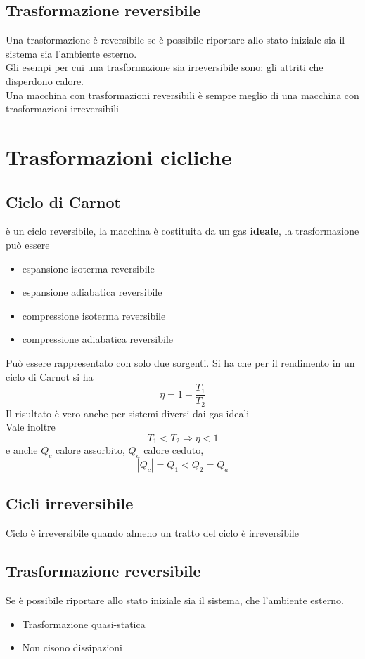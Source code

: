 \documentclass[a4paper]{report}
\begin{document}
  \subsection{Trasformazione reversibile}
  Una trasformazione è reversibile se è possibile riportare allo stato iniziale sia il sistema sia l'ambiente esterno.\\
  Gli esempi per cui una trasformazione sia irreversibile sono: gli attriti che disperdono calore.\\
  Una macchina con trasformazioni reversibili è sempre meglio di una macchina con trasformazioni irreversibili

  \section{Trasformazioni cicliche}
  \subsection{Ciclo di Carnot}
  è un ciclo reversibile, la macchina è costituita da un gas \textbf{ideale}, la trasformazione può essere
  \begin{itemize}
    \item espansione isoterma reversibile
    \item espansione adiabatica reversibile
    \item compressione isoterma reversibile
    \item compressione adiabatica reversibile
  \end{itemize}
  Può essere rappresentato con solo due sorgenti. Si ha che per il rendimento in un ciclo di Carnot si ha
  $$ \eta = 1 - \frac{T_1}{T_2}$$
  Il risultato è vero anche per sistemi diversi dai gas ideali \\
  Vale inoltre
  $$ T_1 < T_2 \Rightarrow \eta < 1 $$
  e anche $Q_c$ calore assorbito, $Q_a$ calore ceduto,
  $$ |Q_c| = Q_1 < Q_2 = Q_a $$

  \subsection{Cicli irreversibile}
  Ciclo è irreversibile quando almeno un tratto del ciclo è irreversibile

  \subsection{Trasformazione reversibile}
  Se è possibile riportare allo stato iniziale sia il sistema, che l'ambiente esterno.
  \begin{itemize}
    \item Trasformazione quasi-statica
    \item Non cisono dissipazioni
  \end{itemize}
\end{document}
